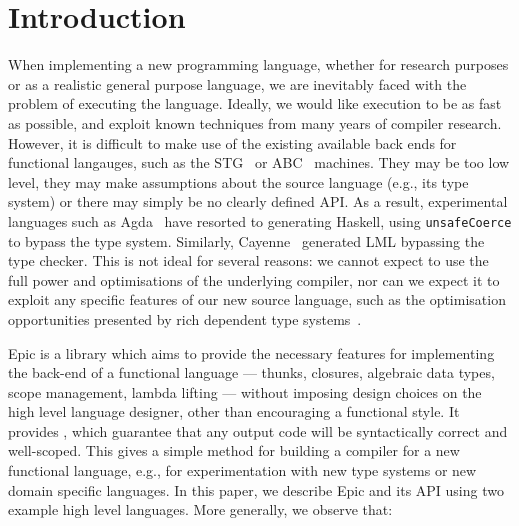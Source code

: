 \section{Introduction}

When implementing a new programming language, whether for research purposes or as
a realistic general purpose language, we are inevitably faced with the
problem of executing the language. Ideally, we would like execution to
be as fast as possible, and exploit known techniques from many years
of compiler research. However, it is difficult to make use of the
existing available back ends for functional langauges, such as the
STG~\cite{evalpush,stg,llvm-haskell} or ABC~\cite{abc-machine}
machines. They may be too low level, they may make assumptions about
the source language (e.g., its type system) or there may simply be no
clearly defined API. As a result, experimental languages such as
Agda~\cite{norell-thesis} have resorted to generating Haskell, using
\texttt{unsafeCoerce} to bypass the type system. Similarly,
Cayenne~\cite{cayenne-icfp} generated LML bypassing the type
checker. This is not ideal for several reasons: we cannot expect to
use the full power and optimisations of the underlying compiler, nor
can we expect it to exploit any specific features of our new source
language, such as the optimisation opportunities presented by rich
dependent type systems~\cite{brady-thesis}.

Epic is a library which aims to provide the necessary features for
implementing the back-end of a functional language --- thunks,
closures, algebraic data types, scope management, lambda lifting ---
without imposing  design choices on the high level language
designer, other than encouraging a functional style. It
provides , which guarantee that any output
code will be syntactically correct and well-scoped.  This gives a
simple method for building a compiler for a new functional language,
e.g., for experimentation with new type systems or new domain specific
languages. In this paper, we describe Epic and its API using two
example high level languages. More generally, we observe that:

